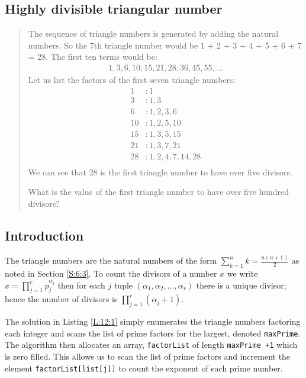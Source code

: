\documentclass[oneside,12pt]{book}   	%
\newcounter{ex}
\newcounter{pr}
\theoremstyle{definition}
\begin{document}
\begin{spacing}{1.618}
			
	
	\chapter{Highly divisible triangular number}
	
		\begin{quote}
			The sequence of triangle numbers is generated by adding the natural numbers. So the 7th triangle number would be 1 + 2 + 3 + 4 + 5 + 6 + 7 = 28. The first ten terms would be:
			\begin{alignat*}{4}
				1, 3, 6, 10, 15, 21, 28, 36, 45, 55, \dots
			\end{alignat*}
			Let us list the factors of the first seven triangle numbers:
			\begin{alignat*}{4}
				 1&: 1\\
				 3&: 1,3\\
				 6&: 1,2,3,6\\
				10&: 1,2,5,10\\
				15&: 1,3,5,15\\
				21&: 1,3,7,21\\
				28&: 1,2,4,7,14,28\\
			\end{alignat*}
			We can see that 28 is the first triangle number to have over five divisors.

			What is the value of the first triangle number to have over five hundred divisors?
		\end{quote}
		
		\section{Introduction}
		
			The triangle numbers are the natural numbers of the form $\sum_{k=1}^n k=\frac{n(n+1)}{2}$ as noted in Section \ref{S:6:3}. To count the divisors of a number $x$ we write $x=\prod_{j=1}^r{p_j^{\alpha_j}}$ then for each $j$ tuple $(\alpha_1, \alpha_2, \dots, \alpha_r)$ there is a unique divisor; hence the number of divisors is $\prod_{j=1}^r(\alpha_j+1)$. 
			
			The solution in Listing \ref{L:12:1} simply enumerates the triangle numbers factoring each integer and scans the list of prime factors for the largest, denoted \texttt{maxPrime}. The algorithm then allocates an array, \texttt{factorList} of length \texttt{maxPrime +1} which is zero filled. This allows us to scan the list of prime factors and increment the element \texttt{factorList[list[j]]} to count the exponent of each prime number. 
			

\end{spacing}
\end{document}

